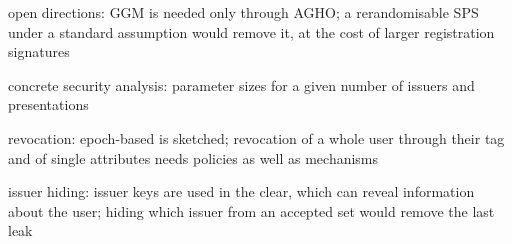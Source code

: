 \begin{outline}
  \item open directions: GGM is needed only through AGHO; a rerandomisable SPS under a standard assumption would remove it, at the cost of larger registration signatures
  \item concrete security analysis: parameter sizes for a given number of issuers and presentations
  \item revocation: epoch-based is sketched; revocation of a whole user through their tag and of single attributes needs policies as well as mechanisms
  \item issuer hiding: issuer keys are used in the clear, which can reveal information about the user; hiding which issuer from an accepted set would remove the last leak
\end{outline}
